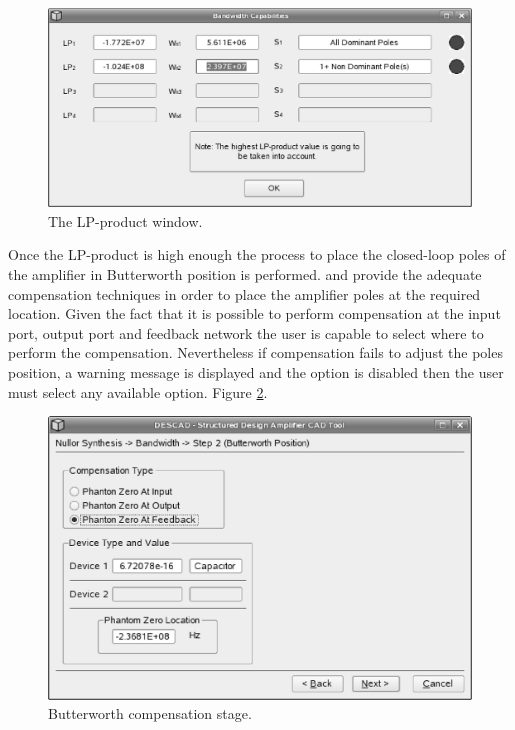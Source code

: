 \documentclass[twocolumn]{IEEEtran}
\begin{document}
\begin{figure}[hbtp]
	\centering
	\includegraphics[scale=0.3]{figuras/wizard5.eps}
	\caption{The LP-product window.}
	\label{fig:descad5}
\end{figure}

Once the LP-product is high enough the process to place the closed-loop poles of the amplifier in Butterworth position is performed. \cite{verhoeven} and \cite{nordholt} provide the adequate compensation techniques in order to place the amplifier poles at the required location. Given the fact that it is possible to perform compensation at the input port, output port and feedback network the user is capable to select where to perform the compensation. Nevertheless if compensation fails to adjust the poles position, a warning message is displayed and the option is disabled then the user must select any available option. Figure \ref{fig:descad6}.

\begin{figure}[hbtp]
	\centering
	\includegraphics[scale=0.3]{figuras/wizard6.eps}
	\caption{Butterworth compensation stage.}
	\label{fig:descad6}
\end{figure}
\end{document}
